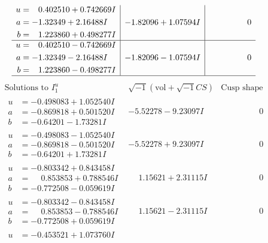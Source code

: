 \documentclass[1p]{elsarticle_modified}
\theoremstyle{definition}
\newcommand{\I}{\sqrt{-1}}
\begin{document}
$$\begin{array}{c|c|c}
\begin{aligned}
u &= \phantom{-}0.402510 + 0.742669 I \\
a &= -1.32349 + 2.16488 I \\
b &= \phantom{-}1.223860 + 0.498277 I\end{aligned}
 & -1.82096 + 1.07594 I & \phantom{-0.000000 } 0 \\ \hline\begin{aligned}
u &= \phantom{-}0.402510 - 0.742669 I \\
a &= -1.32349 - 2.16488 I \\
b &= \phantom{-}1.223860 - 0.498277 I\end{aligned}
 & -1.82096 - 1.07594 I & \phantom{-0.000000 } 0\\
 \hline 
 \end{array}$$\newpage$$\begin{array}{c|c|c}  
\text{Solutions to }I^u_{1}& \I (\text{vol} + \sqrt{-1}CS) & \text{Cusp shape}\\
 \hline 
\begin{aligned}
u &= -0.498083 + 1.052540 I \\
a &= -0.869818 + 0.501520 I \\
b &= -0.64201 - 1.73281 I\end{aligned}
 & -5.52278 - 9.23097 I & \phantom{-0.000000 } 0 \\ \hline\begin{aligned}
u &= -0.498083 - 1.052540 I \\
a &= -0.869818 - 0.501520 I \\
b &= -0.64201 + 1.73281 I\end{aligned}
 & -5.52278 + 9.23097 I & \phantom{-0.000000 } 0 \\ \hline\begin{aligned}
u &= -0.803342 + 0.843458 I \\
a &= \phantom{-}0.853853 + 0.788546 I \\
b &= -0.772508 - 0.059619 I\end{aligned}
 & \phantom{-}1.15621 + 2.31115 I & \phantom{-0.000000 } 0 \\ \hline\begin{aligned}
u &= -0.803342 - 0.843458 I \\
a &= \phantom{-}0.853853 - 0.788546 I \\
b &= -0.772508 + 0.059619 I\end{aligned}
 & \phantom{-}1.15621 - 2.31115 I & \phantom{-0.000000 } 0 \\ \hline\begin{aligned}
u &= -0.453521 + 1.073760 I \\

\end{aligned}
\end{array}$$
\end{document}
